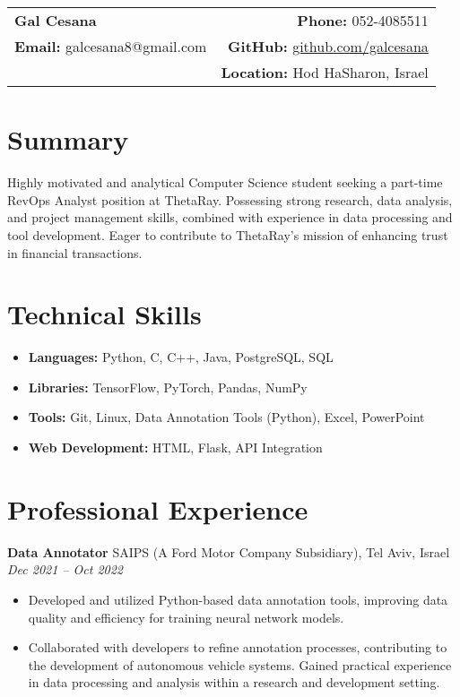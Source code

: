 \documentclass[a4paper,10pt]{article}
\makeatletter
\renewcommand{\maketitle}{
    \hspace{-1em}\begin{tabular*}{\textwidth}{l@{\extracolsep{\fill}}r}
        \textbf{\LARGE Gal Cesana} & \textbf{Phone:} 052-4085511 \\
        \textbf{Email:} galcesana8@gmail.com & \textbf{GitHub:} \href{https://github.com/galcesana}{github.com/galcesana} \\
         & \textbf{Location:} Hod HaSharon, Israel \\
    \end{tabular*}
    \vspace{1em}
}
\makeatother
\begin{document}
\maketitle

\section*{Summary}
Highly motivated and analytical Computer Science student seeking a part-time RevOps Analyst position at ThetaRay.  Possessing strong research, data analysis, and project management skills, combined with experience in data processing and tool development. Eager to contribute to ThetaRay's mission of enhancing trust in financial transactions.

\section*{Technical Skills}
\begin{itemize}[noitemsep,nolistsep]
    \item \textbf{Languages:} Python, C, C++, Java, PostgreSQL, SQL
    \item \textbf{Libraries:} TensorFlow, PyTorch, Pandas, NumPy
    \item \textbf{Tools:} Git, Linux, Data Annotation Tools (Python), Excel, PowerPoint
    \item \textbf{Web Development:} HTML, Flask, API Integration
\end{itemize}

\section*{Professional Experience}
\textbf{Data Annotator} \hfill SAIPS (A Ford Motor Company Subsidiary), Tel Aviv, Israel \\
\textit{Dec 2021 -- Oct 2022}
\begin{itemize}[noitemsep,nolistsep]
    \item Developed and utilized Python-based data annotation tools, improving data quality and efficiency for training neural network models.
    \item Collaborated with developers to refine annotation processes, contributing to the development of autonomous vehicle systems.  Gained practical experience in data processing and analysis within a research and development setting.
\end{itemize}
\end{document}
